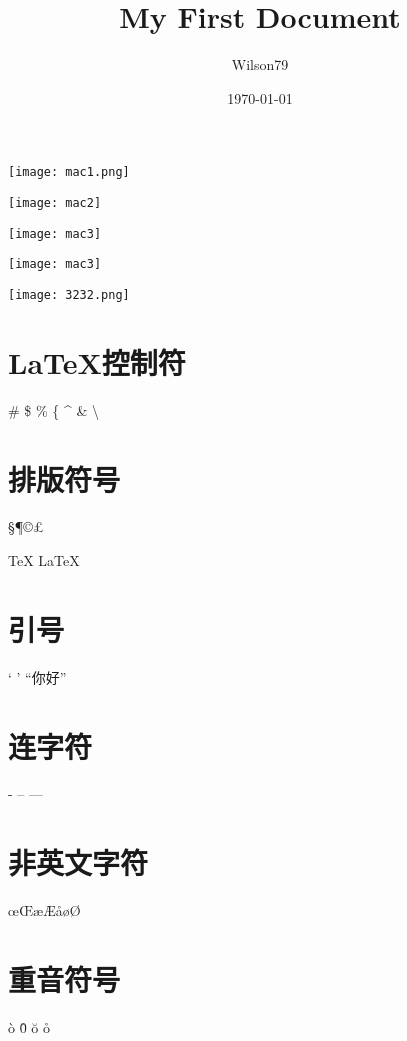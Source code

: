 \documentclass{article}
\title{My First Document}
\author{Wilson79}
\date{\today}
\begin{document}
 
	\tableofcontents %
	\maketitle %

	\texttt{[image: mac1.png]} 

	\texttt{[image: mac2]}
	
	\texttt{[image: mac3]}

	\texttt{[image: mac3]} 


	\texttt{[image: 3232.png]} 

	
	\section{LaTeX控制符} 
	\# \$ \% \{ \^{}  \& \textbackslash %

	\section{排版符号} 
	\S \P \dag \ddag \copyright \pounds

	\TeX{} \LaTeX{} \LaTeXe{} %

	\section{引号}
	` ' ``你好'' %
	\section{连字符} %
	- -- ---
	\section{非英文字符} 
	\oe \OE \ae \AE \aa \o \O
	\section{重音符号} %
	\`o \^0 \u{o} \r{o}
\end{document}
